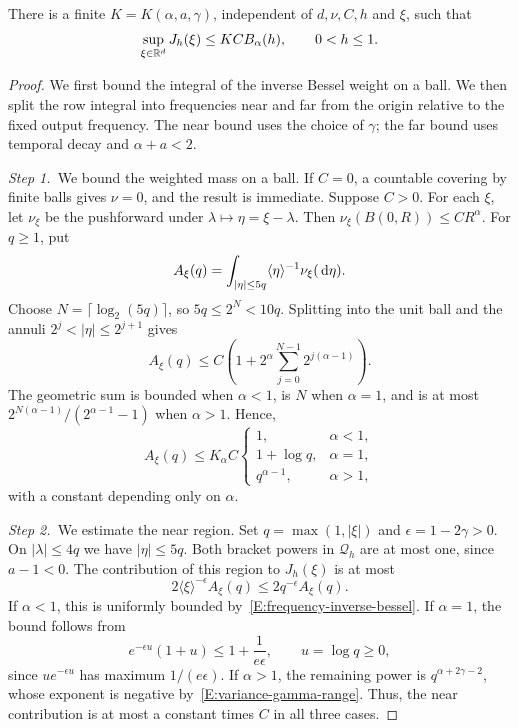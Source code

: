 \begin{proposition}\label{P:frequency-row}
  There is a finite $K = K(\alpha,a,\gamma)$, independent of $d,\nu,C,h$ and
  $\xi$, such that
  \begin{equation}\label{E:frequency-row-bound}
    \sup_{\xi\in\mathbb{R}^d}J_h(\xi) \le K C B_\alpha(h),
    \qquad 0 < h \le 1.
  \end{equation}
\end{proposition}

\begin{proof}
  We first bound the integral of the inverse Bessel weight on a ball. We then
  split the row integral into frequencies near and far from the origin
  relative to the fixed output frequency. The near bound uses the choice of
  $\gamma$; the far bound uses temporal decay and $\alpha+a < 2$.

  \medskip
  \noindent\textit{Step 1.~}We bound the weighted mass on a ball.
  If $C = 0$, a countable covering by finite balls gives $\nu = 0$, and the
  result is immediate. Suppose $C > 0$. For each $\xi$, let $\nu_\xi$ be the
  pushforward under $\lambda \mapsto \eta = \xi-\lambda$. Then $\nu_\xi(B(0,R))
  \le CR^\alpha$. For $q \ge 1$, put
  \[
    A_\xi(q) = \int_{|\eta|\le5q}\langle\eta\rangle^{-1}
    \nu_\xi(\,\mathrm{d}\eta).
  \]
  Choose $N = \lceil\log_2(5q)\rceil$, so $5q \le 2^N < 10q$. Splitting into the
  unit ball and the annuli $2^j < |\eta| \le 2^{j+1}$ gives
  \[
    A_\xi(q) \le C\left(1+2^\alpha
    \sum_{j=0}^{N-1}2^{j(\alpha-1)}\right).
  \]
  The geometric sum is bounded when $\alpha < 1$, is $N$ when $\alpha = 1$, and
  is at most $2^{N(\alpha-1)}/(2^{\alpha-1}-1)$ when $\alpha > 1$. Hence,
  \begin{equation}\label{E:frequency-inverse-bessel}
    A_\xi(q) \le K_\alpha C
    \begin{cases}
      1, & \alpha < 1,\\
      1+\log q, & \alpha = 1,\\
      q^{\alpha-1}, & \alpha > 1,
    \end{cases}
  \end{equation}
  with a constant depending only on $\alpha$.

  \medskip
  \noindent\textit{Step 2.~}We estimate the near region.
  Set $q = \max(1,|\xi|)$ and $\epsilon = 1-2\gamma > 0$. On $|\lambda| \le 4q$
  we have $|\eta| \le 5q$. Both bracket powers in $\mathcal{Q}_h$ are at most
  one, since $a-1 < 0$. The contribution of this region to $J_h(\xi)$ is at most
  \[
    2\langle\xi\rangle^{-\epsilon}A_\xi(q)
    \le 2q^{-\epsilon}A_\xi(q).
  \]
  If $\alpha < 1$, this is uniformly bounded
  by~\eqref{E:frequency-inverse-bessel}. If $\alpha = 1$, the bound follows from
  \[
    e^{-\epsilon u}(1+u) \le 1+\frac1{e\epsilon},
    \qquad u = \log q \ge 0,
  \]
  since $u e^{-\epsilon u}$ has maximum $1/(e\epsilon)$. If $\alpha > 1$, the
  remaining power is $q^{\alpha+2\gamma-2}$, whose exponent is negative
  by~\eqref{E:variance-gamma-range}. Thus, the near contribution is at most a
  constant times $C$ in all three cases.


\end{proof}
